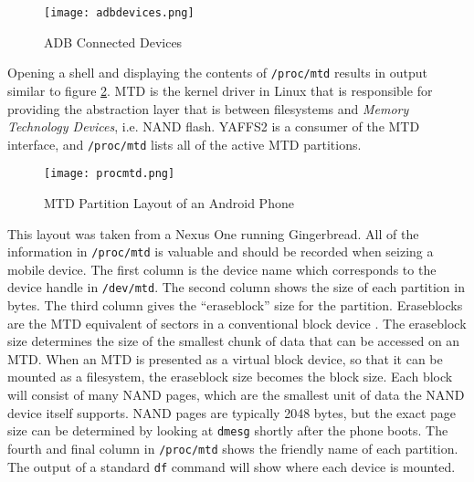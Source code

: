 \begin{figure}[htpb]
\caption{ADB Connected Devices}
\begin{center}\texttt{[image: adbdevices.png]}\end{center}
\label{fig:adbdevices}
\end{figure}

Opening a shell and displaying the contents of \texttt{/proc/mtd} results in output similar to figure \ref{fig:mtd}.  MTD is the
kernel driver in Linux that is responsible for providing the abstraction layer that is between filesystems and \emph{Memory
Technology Devices}, i.e. NAND flash. YAFFS2 is a consumer of the MTD interface, and \texttt{/proc/mtd} lists all of the active MTD
partitions. 

\begin{figure}[htpb]
\caption{MTD Partition Layout of an Android Phone}
\begin{center}\texttt{[image: procmtd.png]}\end{center}
\label{fig:mtd}
\end{figure}	

This layout was taken from a Nexus One running Gingerbread.  All of the information in \texttt{/proc/mtd} is valuable and should be
recorded when seizing a mobile device. The first column is the device name which corresponds to the device handle in
\texttt{/dev/mtd}.  The second column shows the size of each partition in bytes. 
The third column gives the ``eraseblock'' size for the partition.  Eraseblocks are the MTD equivalent of sectors in a conventional block
device \cite{mtdfaq}. The eraseblock size determines the size of the smallest chunk of data that can be accessed on an MTD.  When an MTD
is presented as a virtual block device, so that it can be mounted as a filesystem, the eraseblock size becomes the block size.  Each
block will consist of many NAND pages, which are the smallest unit of data the NAND device itself supports.  NAND pages are
typically 2048 bytes, but the exact page size can be determined by looking at \texttt{dmesg} shortly after the phone boots.  The
fourth and final column in \texttt{/proc/mtd} shows the friendly name of each partition.  The output of a standard \texttt{df}
command will show where each device is mounted.

